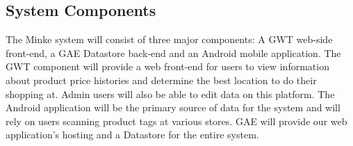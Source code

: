 \subsection{System Components}
The Minke system will consist of three major components: A GWT web-side front-end, a GAE Datastore back-end and an Android mobile application. 
The GWT component will provide a web front-end for users to view information about product price histories and determine the best location to do their shopping at. Admin users will also be able to edit data on this platform. The Android application will be the primary source of data for the system and will rely on users scanning product tags at various stores. GAE will provide our web application's hosting and a Datastore for the entire system.

